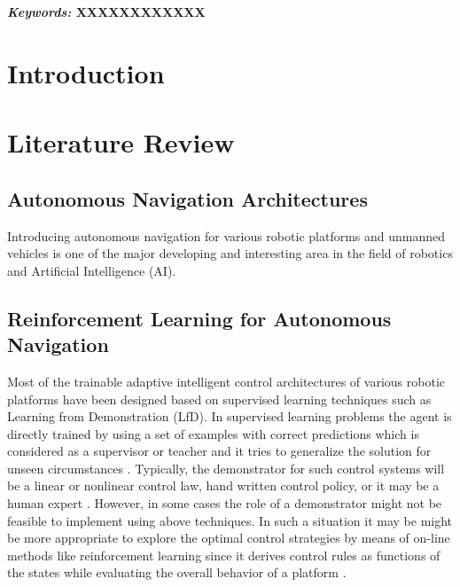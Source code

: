 \documentclass[a4paper,oneside,12pt]{report}
\begin{document}
\textbf{\textit{Keywords:} XXXXXXXXXXXX}



\setlength{\parindent}{5mm}
\normalsize
{}

\tableofcontents
{}
\clearpage


\clearpage



\setlength{\parindent}{5mm}
\normalsize
{}
\chapter{Introduction}
\label{ch:introduction}




\chapter{Literature Review}
\label{ch:litearure review}

\section{Autonomous Navigation Architectures}

Introducing autonomous navigation for various robotic platforms and unmanned vehicles is one of the major developing and interesting area in the field of robotics and Artificial Intelligence (AI). 

\section{Reinforcement Learning for Autonomous Navigation}
Most of the trainable adaptive intelligent control architectures of various robotic platforms have been designed based on supervised learning techniques such as Learning from Demonstration (LfD)\cite{R38}. In supervised learning problems the agent is directly trained by using a set of examples with correct predictions which is considered as a supervisor or teacher and it tries to generalize the solution for unseen circumstances \cite{R03}. Typically, the demonstrator for such control systems will be a linear or nonlinear control law, hand written control policy, or it may be a human expert \cite{R05} \cite{R23}.  However, in some cases the role of a demonstrator might not be feasible to implement using above techniques. In such a situation it may be might be more appropriate to explore the optimal control strategies by means of on-line methods like reinforcement learning since it derives control rules as functions of the states while evaluating the overall behavior of a platform \cite{R38}.
\end{document}
